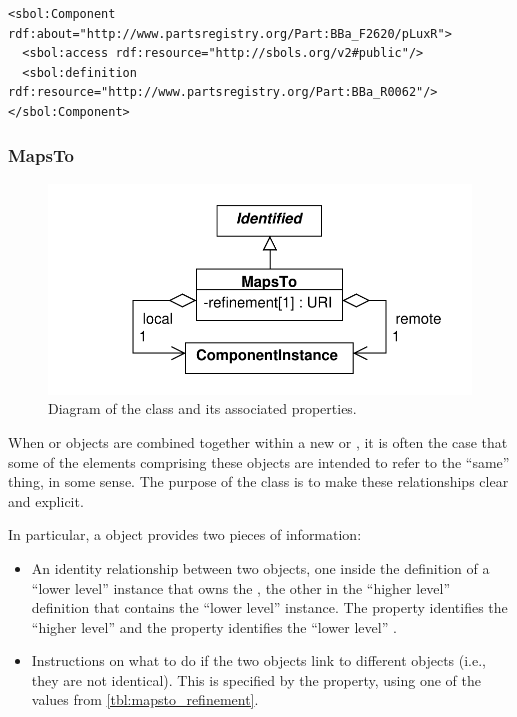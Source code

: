 \begin{lstlisting}
<sbol:Component rdf:about="http://www.partsregistry.org/Part:BBa_F2620/pLuxR">
  <sbol:access rdf:resource="http://sbols.org/v2#public"/>
  <sbol:definition rdf:resource="http://www.partsregistry.org/Part:BBa_R0062"/>
</sbol:Component>
\end{lstlisting}



\subsubsection{MapsTo}
\label{sec:MapsTo}

\begin{figure}[ht]
\begin{center}
\includegraphics[scale=0.6]{uml/maps_to}
\caption[]{Diagram of the  class and its associated properties.}
\label{uml:maps_to}
\end{center}
\end{figure}

When  or  objects are combined together within a new  or , it is often the case that some of the elements comprising these objects are intended to refer to the ``same'' thing, in some sense.
The purpose of the  class is to make these relationships clear and explicit.

In particular, a  object provides two pieces of information:
\begin{itemize}
\item An identity relationship between two 
  objects, one inside the definition of a ``lower level'' instance that owns the
  , the other in the ``higher level'' definition that
  contains the ``lower level'' instance.  The  property identifies the ``higher
  level''  and the  property
  identifies the ``lower level'' .
\item Instructions on what to do if the two 
  objects link to different  objects (i.e.,
  they are not identical).  This is specified by the 
  property, using one of the values from \ref{tbl:mapsto_refinement}.
\end{itemize}

